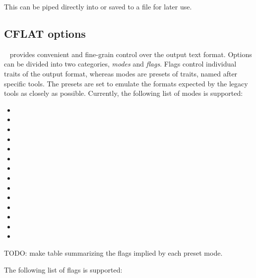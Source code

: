 This can be piped directly into  or saved to a file for later use.  

\subsection{CFLAT options}
\label{sec:legacy:cflat:options}

\binhackt\  provides convenient and fine-grain control
over the output text format.  
Options can be divided into two categories, \emph{modes} and \emph{flags}.  
Flags control individual traits of the output format, 
whereas modes are presets of traits, named after specific tools. 
The presets are set to emulate the formats expected by the legacy tools
as closely as possible.  
Currently, the following list of modes is supported:

\begin{itemize}
\item {}
\item {}
\item {}
\item {}
\item {}
\item {}
\item {}
\item {}
\item {}
\item {}
\item {}
\item {}
\item {}
\item {}
\end{itemize}

TODO: make table summarizing the flags implied by each preset mode.  

The following list of flags is supported:

